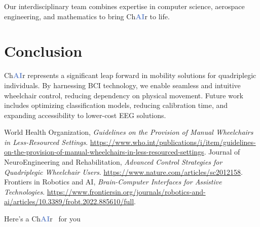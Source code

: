 \documentclass[a4paper]{article}
\makeatletter
\newcommand\chair{%
  Ch\textcolor[HTML]{6B8ACD}{\textbf{AI}}r
  \@}
\makeatother
\begin{document}
Our interdisciplinary team combines expertise in computer science, aerospace engineering, and mathematics to bring \chair to life.

\section{Conclusion}

\chair represents a significant leap forward in mobility solutions for quadriplegic individuals. By harnessing BCI technology, we enable seamless and intuitive wheelchair control, reducing dependency on physical movement. Future work includes optimizing classification models, reducing calibration time, and expanding accessibility to lower-cost EEG solutions.

\begin{thebibliography}{9}
 World Health Organization, \textit{Guidelines on the Provision of Manual Wheelchairs in Less-Resourced Settings}. \url{https://www.who.int/publications/i/item/guidelines-on-the-provision-of-manual-wheelchairs-in-less-resourced-settings}.
 Journal of NeuroEngineering and Rehabilitation, \textit{Advanced Control Strategies for Quadriplegic Wheelchair Users}. \url{https://www.nature.com/articles/sc2012158}.
 Frontiers in Robotics and AI, \textit{Brain-Computer Interfaces for Assistive Technologies}. \url{https://www.frontiersin.org/journals/robotics-and-ai/articles/10.3389/frobt.2022.885610/full}.
\end{thebibliography}

Here's a \chair\ for you
\end{document}

